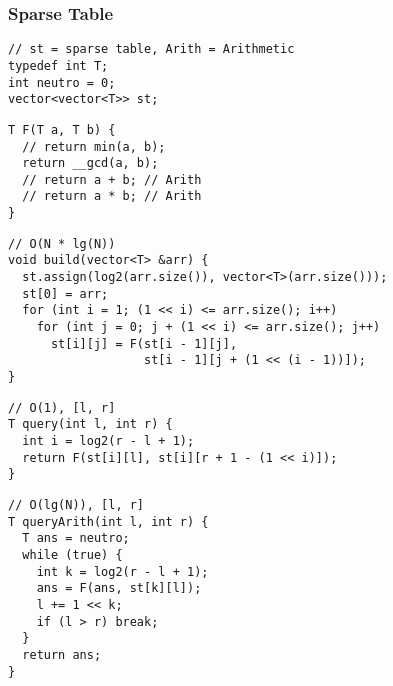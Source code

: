\documentclass[twoside]{article}
\begin{document}
\begin{multicols*}{2}
\subsubsection*{Sparse Table}
\begin{verbatim}
// st = sparse table, Arith = Arithmetic
typedef int T;
int neutro = 0;
vector<vector<T>> st;
\end{verbatim}
\vspace{-12pt}
\begin{verbatim}
T F(T a, T b) {
  // return min(a, b);
  return __gcd(a, b);
  // return a + b; // Arith
  // return a * b; // Arith
}
\end{verbatim}
\vspace{-12pt}
\begin{verbatim}
// O(N * lg(N))
void build(vector<T> &arr) {
  st.assign(log2(arr.size()), vector<T>(arr.size()));
  st[0] = arr;
  for (int i = 1; (1 << i) <= arr.size(); i++)
    for (int j = 0; j + (1 << i) <= arr.size(); j++)
      st[i][j] = F(st[i - 1][j],
                   st[i - 1][j + (1 << (i - 1))]);
}
\end{verbatim}
\vspace{-12pt}
\begin{verbatim}
// O(1), [l, r]
T query(int l, int r) {
  int i = log2(r - l + 1);
  return F(st[i][l], st[i][r + 1 - (1 << i)]);
}
\end{verbatim}
\vspace{-12pt}
\begin{verbatim}
// O(lg(N)), [l, r]
T queryArith(int l, int r) {
  T ans = neutro;
  while (true) {
    int k = log2(r - l + 1);
    ans = F(ans, st[k][l]);
    l += 1 << k;
    if (l > r) break;
  }
  return ans;
}
\end{verbatim}

\subsubsectionfont{\large\bfseries\sffamily\underline}

\end{multicols*}
\end{document}
